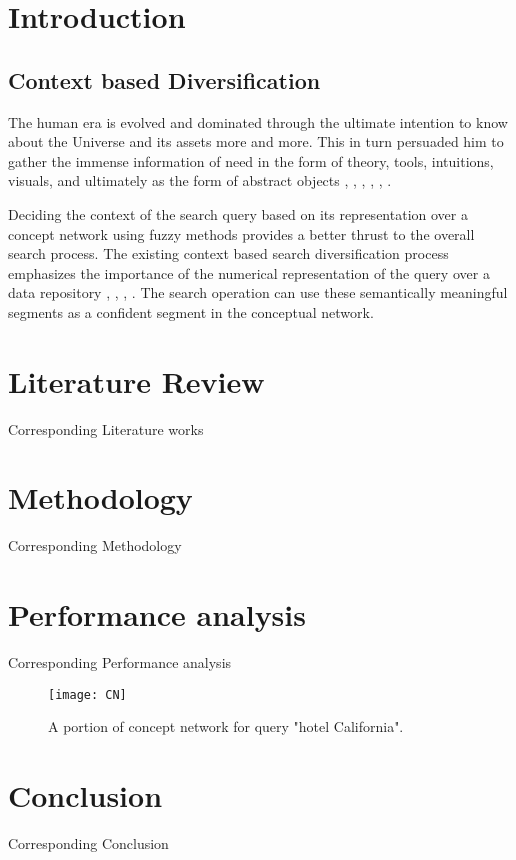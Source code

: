 \documentclass[a4paper, 12pt]{report}
\begin{document}

 
\tableofcontents
\thispagestyle{empty}
\chapter{Introduction}
\setcounter{page}{1} 
\section{Context based Diversification}
The human era is evolved and dominated through the ultimate intention to know about the Universe and its assets more and more. This in turn persuaded him to gather the immense information of need in the form of theory, tools, intuitions, visuals, and ultimately as the form of abstract objects \cite{ffy}, \cite{xyshw}, \cite{tbhs}, \cite{dpgk}, \cite{jaip}, \cite{pdkgvym}. 

Deciding the context of the search query based on its representation over a concept network using fuzzy methods provides a better thrust to the overall search process. The existing context based search diversification process emphasizes the importance of the numerical representation of the query over a data repository \cite{fpsu}, \cite{sysxh}, \cite{zwjfw}, \cite{dwhh}. The search operation can use these semantically meaningful segments as a confident segment in the conceptual network.  
\chapter{Literature Review}
Corresponding Literature works 
\chapter{Methodology} 
Corresponding Methodology
\chapter{Performance analysis} 
Corresponding Performance analysis 
\renewcommand{\thefigure}{4.1}
\begin{figure}[htbp] 
\centerline{\texttt{[image: CN]}}
\caption{A portion of concept network for query "hotel California".} 
\label{fig}
\end{figure} 
\chapter{Conclusion} 
Corresponding Conclusion 
 
 
\end{document}
